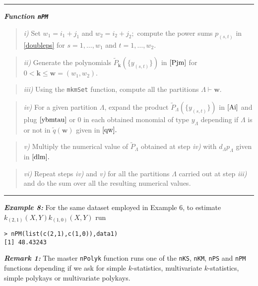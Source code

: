 \rule{13cm}{0.4pt}

\textbf{\emph{Function \texttt{nPM}}}

\begin{quote}
\emph{i)} Set \(w_1=i_1+j_1\) and \(w_2=i_2+j_2;\) compute the power sums \(p_{(s,t)}\) in \eqref{doubleps} for \(s=1, \ldots, w_1\) and \(t=1, \ldots, w_2.\)
\end{quote}

\begin{quote}
\emph{ii)} Generate the polynomials \(\tilde{P}_{\boldsymbol{k}} \left( \{y_{(s,t)}\} \right)\) in \(\eqref{Pjm}\) for \(0<\boldsymbol{k} \leq \boldsymbol{w}=(w_1,w_2).\)
\end{quote}

\begin{quote}
\emph{iii)} Using the \texttt{mkmSet} function, compute all the partitions \(\Lambda \vdash \boldsymbol{w}.\)
\end{quote}

\begin{quote}
\emph{iv)} For a given partition \(\Lambda\), expand the product \(\tilde{P}_{\Lambda}\left( \{y_{(s,t)}\}\right)\) in \(\eqref{Ai}\) and plug \(\eqref{ybmtau}\) or \(0\) in each obtained monomial of type \(y_{\Lambda}\)
depending if \(\Lambda\) is or not in \(\tilde{q}(\boldsymbol{w})\) given in \(\eqref{qw}.\)
\end{quote}

\begin{quote}
\emph{v)} Multiply the numerical value of \(\tilde{P}_{\Lambda}\) obtained at step \emph{iv)} with \(d_{\Lambda} p_{\Lambda}\) given in \(\eqref{dlm}.\)
\end{quote}

\begin{quote}
\emph{vi)} Repeat steps \emph{iv)} and \emph{v)} for all the partitions \(\Lambda\) carried out at step \emph{iii)} and do the sum over all the resulting numerical values.
\end{quote}

\noindent

\rule{13cm}{0.4pt}

\hskip-0.5cm\textbf{\emph{Example 8:}} For the same dataset employed in Example 6, to
estimate \(k_{(2,1)}(X,Y) k_{(1,0)}(X,Y)\) run

\begin{verbatim}
> nPM(list(c(2,1),c(1,0)),data1)
[1] 48.43243
\end{verbatim}

\noindent
\textbf{\emph{Remark 1:}} The master \texttt{nPolyk} function runs one of the \texttt{nKS}, \texttt{nKM}, \texttt{nPS} and \texttt{nPM} functions depending if we ask for simple \(k\)-statistics, multivariate \(k\)-statistics, simple polykays or multivariate polykays.

